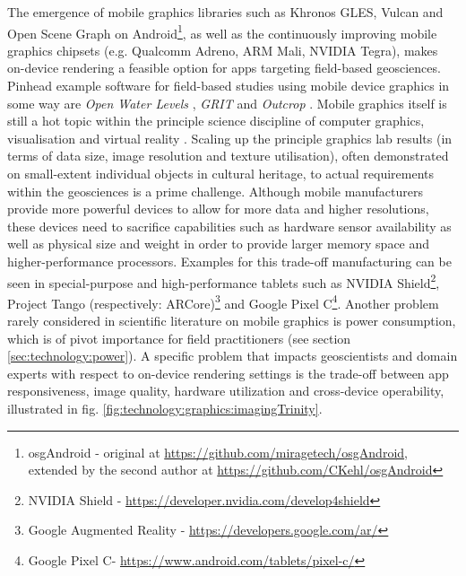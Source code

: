 \documentclass[review]{elsarticle}
\begin{document}
The emergence of mobile graphics libraries such as Khronos \gls{GLES}, Vulcan and Open Scene Graph on Android\footnote{osgAndroid - original at \url{https://github.com/miragetech/osgAndroid}, extended by the second author at \url{https://github.com/CKehl/osgAndroid}}, as well as the continuously improving mobile graphics chipsets (e.g. Qualcomm Adreno, ARM Mali, NVIDIA Tegra), makes on-device rendering a feasible option for apps targeting field-based geosciences. Pinhead example software for field-based studies using mobile device graphics in some way are \textit{Open Water Levels} \cite{Kroehnert2017a}, \textit{\gls{GRIT}} \cite{Kehl2016_VGCabstract} and \textit{Outcrop} \cite{Viseur2014_VGCabstract}. Mobile graphics itself is still a hot topic within the principle science discipline of computer graphics, visualisation and virtual reality \cite{Rodriguez2012,Rodriguez2014,Garcia2015,Agus2017}. Scaling up the principle graphics lab results (in terms of data size, image resolution and texture utilisation), often demonstrated on small-extent individual objects in cultural heritage, to actual requirements within the geosciences is a prime challenge. Although mobile manufacturers provide more powerful devices to allow for more data and higher resolutions, these devices need to sacrifice capabilities such as hardware sensor availability as well as physical size and weight in order to provide larger memory space and higher-performance processors. Examples for this trade-off manufacturing can be seen in special-purpose and high-performance tablets such as NVIDIA Shield\footnote{NVIDIA Shield - \url{https://developer.nvidia.com/develop4shield}}, Project Tango (respectively: ARCore)\footnote{Google Augmented Reality - \url{https://developers.google.com/ar/}} and Google Pixel C\footnote{Google Pixel C- \url{https://www.android.com/tablets/pixel-c/}}. Another problem rarely considered in scientific literature on mobile graphics is power consumption, which is of pivot importance for field practitioners (see section \ref{sec:technology:power}). A specific problem that impacts geoscientists and domain experts with respect to on-device rendering settings is the trade-off between app responsiveness, image quality, hardware utilization and cross-device operability, illustrated in fig. \ref{fig:technology:graphics:imagingTrinity}.
\end{document}

